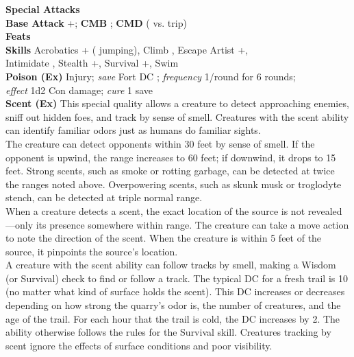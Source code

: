 \textbf{Special Attacks} \specialattacks \\
\textbf{Base Attack} +\baseattack; \textbf{CMB} \enhancedstat{\allycmb}; \textbf{CMD} \enhancedstat{\allycmd} \hspace{1pt} (\enhancedstat{\allytripcmd} \hspace{1pt} vs. trip) \\ 
\textbf{Feats} \feats \\
\textbf{Skills} Acrobatics +\acrobaticsskill \hspace{1pt} (\jumpskill \hspace{1pt} jumping), Climb \enhancedstat{+\climbskill}, Escape Artist +\escapeartistskill, \\ Intimidate \intimidateskill, Stealth +\stealthskill, Survival +\survivalskill, Swim \enhancedstat{+\swimskill} \\

\textbf{Poison (Ex)} Injury; \textit{save} Fort DC ; \textit{frequency} 1/round for 6 rounds; \\ \textit{effect} 1d2 Con damage; \textit{cure} 1 save \\

\textbf{Scent (Ex)} This special quality allows a creature to detect approaching enemies, sniff out hidden foes, and track by sense of smell. Creatures with the scent ability can identify familiar odors just as humans do familiar sights. \\

The creature can detect opponents within 30 feet by sense of smell. If the opponent is upwind, the range increases to 60 feet; if downwind, it drops to 15 feet. Strong scents, such as smoke or rotting garbage, can be detected at twice the ranges noted above. Overpowering scents, such as skunk musk or troglodyte stench, can be detected at triple normal range. \\

When a creature detects a scent, the exact location of the source is not revealed—only its presence somewhere within range. The creature can take a move action to note the direction of the scent. When the creature is within 5 feet of the source, it pinpoints the source's location. \\

A creature with the scent ability can follow tracks by smell, making a Wisdom (or Survival) check to find or follow a track. The typical DC for a fresh trail is 10 (no matter what kind of surface holds the scent). This DC increases or decreases depending on how strong the quarry's odor is, the number of creatures, and the age of the trail. For each hour that the trail is cold, the DC increases by 2. The ability otherwise follows the rules for the Survival skill. Creatures tracking by scent ignore the effects of surface conditions and poor visibility. \\

\newpage
